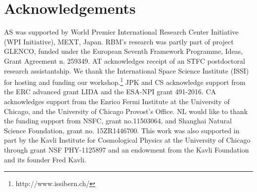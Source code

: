 \documentclass[useAMS,usenatbib]{mnras}
\begin{document}
\section*{Acknowledgements}
AS was supported by World Premier International Research Center Initiative (WPI Initiative), MEXT, Japan.
RBM's research was partly part of project GLENCO, funded under the European Seventh Framework Programme, Ideas, Grant Agreement n. 259349.
AT acknowledges receipt of an STFC postdoctoral research
assistantship.
We thank the International Space Science Institute (ISSI) for hosting and funding our workshop.\footnote{http://www.issibern.ch/}
JPK and CS acknowledge support from the ERC advanced grant LIDA and the ESA-NPI grant 491-2016.
CA acknowledges support from the Enrico Fermi
Institute at the University of Chicago, and the University of Chicago
Provost's Office. NL would like to thank the funding support from
NSFC, grant no.11503064, and Shanghai Natural Science Foundation,
grant no. 15ZR1446700. This work was also supported in part by the
Kavli Institute for Cosmological Physics at the University of Chicago
through grant NSF PHY-1125897 and an endowment from the Kavli
Foundation and its founder Fred Kavli.






\appendix

\label{lastpage}
\end{document}
